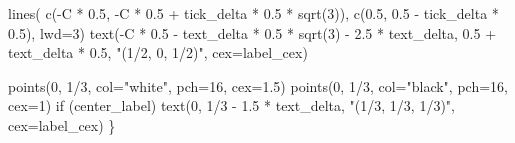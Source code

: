 \documentclass[
  letterpaper,
  DIV=11,
  numbers=noendperiod]{scrartcl}
\newenvironment{Shaded}{\begin{snugshade}}{\end{snugshade}}
\newcommand{\AttributeTok}[1]{\textcolor[rgb]{0.40,0.45,0.13}{#1}}
\newcommand{\ControlFlowTok}[1]{\textcolor[rgb]{0.00,0.23,0.31}{#1}}
\newcommand{\DecValTok}[1]{\textcolor[rgb]{0.68,0.00,0.00}{#1}}
\newcommand{\FloatTok}[1]{\textcolor[rgb]{0.68,0.00,0.00}{#1}}
\newcommand{\FunctionTok}[1]{\textcolor[rgb]{0.28,0.35,0.67}{#1}}
\newcommand{\NormalTok}[1]{\textcolor[rgb]{0.00,0.23,0.31}{#1}}
\newcommand{\SpecialCharTok}[1]{\textcolor[rgb]{0.37,0.37,0.37}{#1}}
\newcommand{\StringTok}[1]{\textcolor[rgb]{0.13,0.47,0.30}{#1}}
\begin{document}
\begin{Shaded}
\begin{Highlighting}[]
  \FunctionTok{lines}\NormalTok{( }\FunctionTok{c}\NormalTok{(}\SpecialCharTok{{-}}\NormalTok{C }\SpecialCharTok{*} \FloatTok{0.5}\NormalTok{, }\SpecialCharTok{{-}}\NormalTok{C }\SpecialCharTok{*} \FloatTok{0.5} \SpecialCharTok{+}\NormalTok{ tick\_delta }\SpecialCharTok{*} \FloatTok{0.5} \SpecialCharTok{*} \FunctionTok{sqrt}\NormalTok{(}\DecValTok{3}\NormalTok{)),}
         \FunctionTok{c}\NormalTok{(}\FloatTok{0.5}\NormalTok{, }\FloatTok{0.5} \SpecialCharTok{{-}}\NormalTok{ tick\_delta }\SpecialCharTok{*} \FloatTok{0.5}\NormalTok{), }\AttributeTok{lwd=}\DecValTok{3}\NormalTok{)}
  \FunctionTok{text}\NormalTok{(}\SpecialCharTok{{-}}\NormalTok{C }\SpecialCharTok{*} \FloatTok{0.5} \SpecialCharTok{{-}}\NormalTok{ text\_delta }\SpecialCharTok{*} \FloatTok{0.5} \SpecialCharTok{*} \FunctionTok{sqrt}\NormalTok{(}\DecValTok{3}\NormalTok{) }\SpecialCharTok{{-}} \FloatTok{2.5} \SpecialCharTok{*}\NormalTok{ text\_delta,}
       \FloatTok{0.5} \SpecialCharTok{+}\NormalTok{ text\_delta }\SpecialCharTok{*} \FloatTok{0.5}\NormalTok{, }\StringTok{"(1/2, 0, 1/2)"}\NormalTok{, }\AttributeTok{cex=}\NormalTok{label\_cex)}

  \FunctionTok{points}\NormalTok{(}\DecValTok{0}\NormalTok{, }\DecValTok{1}\SpecialCharTok{/}\DecValTok{3}\NormalTok{, }\AttributeTok{col=}\StringTok{"white"}\NormalTok{, }\AttributeTok{pch=}\DecValTok{16}\NormalTok{, }\AttributeTok{cex=}\FloatTok{1.5}\NormalTok{)}
  \FunctionTok{points}\NormalTok{(}\DecValTok{0}\NormalTok{, }\DecValTok{1}\SpecialCharTok{/}\DecValTok{3}\NormalTok{, }\AttributeTok{col=}\StringTok{"black"}\NormalTok{, }\AttributeTok{pch=}\DecValTok{16}\NormalTok{, }\AttributeTok{cex=}\DecValTok{1}\NormalTok{)}
  \ControlFlowTok{if}\NormalTok{ (center\_label)}
    \FunctionTok{text}\NormalTok{(}\DecValTok{0}\NormalTok{, }\DecValTok{1}\SpecialCharTok{/}\DecValTok{3} \SpecialCharTok{{-}} \FloatTok{1.5} \SpecialCharTok{*}\NormalTok{ text\_delta, }\StringTok{"(1/3, 1/3, 1/3)"}\NormalTok{, }\AttributeTok{cex=}\NormalTok{label\_cex)}
\NormalTok{\}}
\end{Highlighting}
\end{Shaded}
\end{document}
